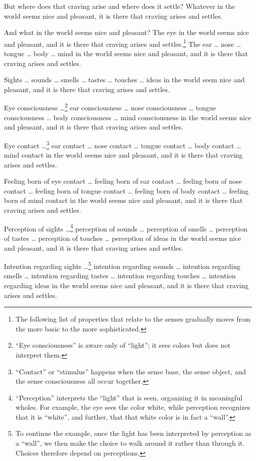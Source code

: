 \documentclass[12pt,openany]{book}%
\begin{document}
But where does that craving arise and where does it settle? Whatever in the world seems nice and pleasant, it is there that craving arises and settles. 

And what in the world seems nice and pleasant? The eye in the world seems nice and pleasant, and it is there that craving arises and settles.\footnote{The following list of properties that relate to the senses gradually moves from the more basic to the more sophisticated. } The ear … nose … tongue … body … mind in the world seems nice and pleasant, and it is there that craving arises and settles. 

Sights … sounds … smells … tastes … touches … ideas in the world seem nice and pleasant, and it is there that craving arises and settles. 

Eye consciousness …\footnote{“Eye consciousness” is aware only of “light”; it sees colors but does not interpret them. } ear consciousness … nose consciousness … tongue consciousness … body consciousness … mind consciousness in the world seems nice and pleasant, and it is there that craving arises and settles. 

Eye contact …\footnote{“Contact” or “stimulus” happens when the sense base, the sense object, and the sense consciousness all occur together. } ear contact … nose contact … tongue contact … body contact … mind contact in the world seems nice and pleasant, and it is there that craving arises and settles. 

Feeling born of eye contact … feeling born of ear contact … feeling born of nose contact … feeling born of tongue contact … feeling born of body contact … feeling born of mind contact in the world seems nice and pleasant, and it is there that craving arises and settles. 

Perception of sights …\footnote{“Perception” interprets the “light” that is seen, organizing it in meaningful wholes. For example, the eye sees the color white, while perception recognizes that it is “white”, and further, that that white color is in fact a “wall”. } perception of sounds … perception of smells … perception of tastes … perception of touches … perception of ideas in the world seems nice and pleasant, and it is there that craving arises and settles. 

Intention regarding sights …\footnote{To continue the example, once the light has been interpreted by perception as a “wall”, we then make the choice to walk around it rather than through it. Choices therefore depend on perceptions. } intention regarding sounds … intention regarding smells … intention regarding tastes … intention regarding touches … intention regarding ideas in the world seems nice and pleasant, and it is there that craving arises and settles. 
\end{document}
